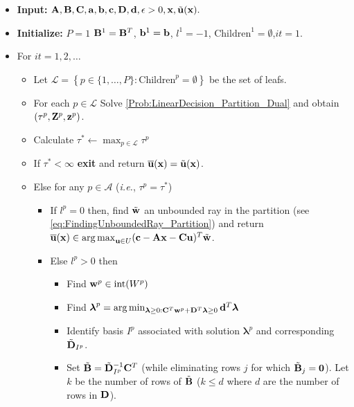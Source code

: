 \documentclass[12pt,x11names]{article}
\theoremstyle{definition}
\newcommand{\paren}[1]{\left\{ {#1} \right\}} %
\newcommand{\inter}{\mathrm{int}} %
\newcommand{\ie}{{\em i.e.}, }
\newcommand{\bzero}{{\bf 0}}
\newcommand{\ba}{{\bf a}}
\newcommand{\bb}{{\bf b}}
\newcommand{\bc}{{\bf c}}
\newcommand{\bd}{{\bf d}}
\newcommand{\bu}{{\bf u}}
\newcommand{\bw}{{\bf w}}
\newcommand{\bx}{{\bf x}}
\newcommand{\bz}{{\bf z}}
\newcommand{\bba}{{\bf A}}
\newcommand{\bbb}{{\bf B}}
\newcommand{\bbc}{{\bf C}}
\newcommand{\bbd}{{\bf D}}
\newcommand{\bbz}{{\bf Z}}
\newcommand{\blambda}{{\boldsymbol \lambda}}
\DeclareMathOperator*{\argmax}{arg\,max}
\begin{document}
\begin{algorithm}[h]\caption{Dual Basis Cuts (DBC)}\label{alg:Dcuts}
		\begin{itemize}
       		\item[$\rm{(1)}$] {\bf Input:} $\bba,\bbb,\bbc,\ba,\bb,\bc,\bbd,\bd, \epsilon>0,\bx,\tilde{\bu}(\bx).$
            \item[$\rm{(2)}$] {\bf Initialize:} $P=1$ $\bbb^1=\bbb^T$, $\bb^1=\bb$, $l^1=-1$, $\text{Children}^1=\emptyset$,$it=1$.  
            \item[$\rm{(3)}$] For $it=1,2,\ldots$ 
            \begin{itemize}           
            \item[$\rm{(a)}$] Let $\mathcal{L}=\paren{p\in\{1,\ldots,P\}:\text{Children}^p=\emptyset}$ be the set of leafs.
            \item[$\rm{(b)}$] For each $p\in\mathcal{L}$ Solve \eqref{Prob:LinearDecision_Partition_Dual} and obtain $(\tau^p,\bbz^p,\bz^p)$. 
            \item[$\rm{(c)}$] Calculate $\tau^*\leftarrow\max_{p\in\mathcal{L}}\tau^p$ 
            \item[$\rm{(d)}$] If $\tau^*<\infty$ {\bf exit} and return $\overline{\bu}(\bx)=\tilde{\bu}(\bx)$.
            \item[$\rm{(e)}$] Else for any $p\in\mathcal{A}$ (\ie $\tau^p=\tau^*$)
            \begin{itemize}
             \item[$\rm{(i)}$] If $l^p=0$ then, find $\tilde{\bw}$ an unbounded ray in the partition (see \eqref{eq:FindingUnboundedRay_Partition})  and return $\overline{\bu}(\bx)\in\argmax_{\bu\in U} (\bc-\bba\bx-\bbc\bu)^T\tilde{\bw}$.
             \item[$\rm{(ii)}$] Else $l^p>0$ then            
             \begin{itemize}
              \item Find $\bw^p\in \inter(W^p)$             
              \item Find $\blambda^p=\arg\min_{\blambda\geq 0:\bbc^T\bw^p+\bbd^T\blambda\geq0} \bd^T\blambda$
              \item Identify basis $I^p$ associated with solution $\blambda^p$ and corresponding $\tilde{\bbd}_{I^p}$. 
              \item Set $\tilde{\bbb}=\tilde{\bbd}_{I^p}^{-1}\bbc^T$ (while eliminating rows $j$ for which $\tilde{\bbb}_j=\bzero$). Let $k$ be the number of rows of $\tilde{\bbb}$ ($k\leq d$ where $d$ are the number of rows in $\bbd$).   

\end{itemize}
\end{itemize}
\end{itemize}
\end{itemize}
\end{algorithm}
\end{document}
